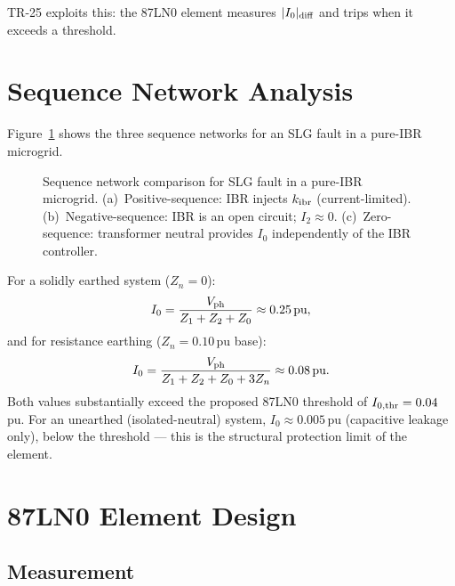 \documentclass[11pt,a4paper]{article}
\begin{document}
TR-25 exploits this: the 87LN0 element measures $|I_0|_{\rm diff}$ and trips
when it exceeds a threshold.

\section{Sequence Network Analysis}

Figure~\ref{fig:seq_network} shows the three sequence networks for an SLG fault
in a pure-IBR microgrid.

\begin{figure}[h!]
  \centering
  
  \caption{Sequence network comparison for SLG fault in a pure-IBR microgrid.
           (a)~Positive-sequence: IBR injects $k_{\rm ibr}$ (current-limited).
           (b)~Negative-sequence: IBR is an open circuit; $I_2 \approx 0$.
           (c)~Zero-sequence: transformer neutral provides $I_0$ independently
           of the IBR controller.}
  \label{fig:seq_network}
\end{figure}

For a solidly earthed system ($Z_n = 0$):
\begin{equation}
  I_0 = \frac{V_{\rm ph}}{Z_1 + Z_2 + Z_0}
      \approx 0.25\,\text{pu},
  \label{eq:I0_solid}
\end{equation}
and for resistance earthing ($Z_n = 0.10$\,pu base):
\begin{equation}
  I_0 = \frac{V_{\rm ph}}{Z_1 + Z_2 + Z_0 + 3Z_n}
      \approx 0.08\,\text{pu}.
  \label{eq:I0_resistance}
\end{equation}
Both values substantially exceed the proposed 87LN0 threshold of
$I_{0,\rm thr} = 0.04$\,pu.  For an unearthed (isolated-neutral) system,
$I_0 \approx 0.005$\,pu (capacitive leakage only), below the threshold —
this is the structural protection limit of the element.

\section{87LN0 Element Design}

\subsection{Measurement}
\end{document}
